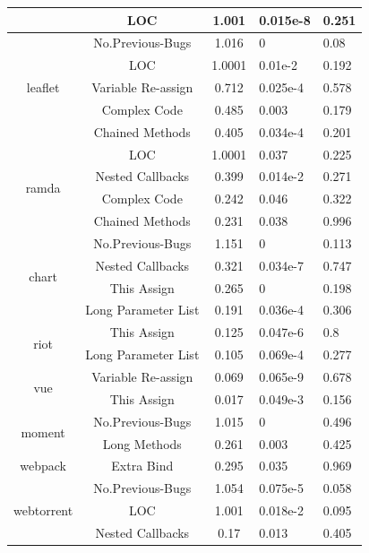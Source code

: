 \begin{table}[t]
\begin{tabular}{c|c|c|p{1.1cm}|p{1.3cm}}
		& LOC & 1.001 & 0.015e-8 & 0.251 \\ \hline
		\multirow{5}{*}{leaflet}
		& No.Previous-Bugs & 1.016 & 0 & 0.08 \\ \cline{2-5}
		& LOC & 1.0001 & 0.01e-2 & 0.192 \\ \cline{2-5}
		& Variable Re-assign & 0.712 & 0.025e-4 & 0.578 \\ \cline{2-5}
		& Complex Code & 0.485 & 0.003 & 0.179 \\ \cline{2-5}
		& Chained Methods & 0.405 & 0.034e-4 & 0.201 \\ \hline
		\multirow{4}{*}{ramda}
		& LOC & 1.0001 & 0.037 & 0.225 \\ \cline{2-5}
		& Nested Callbacks & 0.399 & 0.014e-2 & 0.271 \\ \cline{2-5}
		& Complex Code & 0.242 & 0.046 & 0.322 \\ \cline{2-5}
		& Chained Methods & 0.231 & 0.038 & 0.996 \\ \hline
		\multirow{4}{*}{chart}
		& No.Previous-Bugs & 1.151 & 0 & 0.113 \\ \cline{2-5}
		& Nested Callbacks & 0.321 & 0.034e-7 & 0.747 \\ \cline{2-5}
		& This Assign & 0.265 & 0 & 0.198 \\ \cline{2-5}
		& Long Parameter List & 0.191 & 0.036e-4 & 0.306 \\ \hline
		\multirow{2}{*}{riot}
		& This Assign & 0.125 & 0.047e-6 & 0.8 \\ \cline{2-5}
		& Long Parameter List & 0.105 & 0.069e-4 & 0.277 \\ \hline
		\multirow{2}{*}{vue}
		& Variable Re-assign & 0.069 & 0.065e-9 & 0.678 \\ \cline{2-5}
		& This Assign & 0.017 & 0.049e-3 & 0.156 \\ \hline
		\multirow{2}{*}{moment}
		& No.Previous-Bugs & 1.015 & 0 & 0.496 \\ \cline{2-5}
		& Long Methods & 0.261 & 0.003 & 0.425 \\ \hline
		\multirow{1}{*}{webpack}
		& Extra Bind & 0.295 & 0.035 & 0.969 \\ \hline
		\multirow{3}{*}{webtorrent}
		& No.Previous-Bugs & 1.054 & 0.075e-5 & 0.058 \\ \cline{2-5}
		& LOC & 1.001 & 0.018e-2 & 0.095 \\ \cline{2-5}
		& Nested Callbacks & 0.17 & 0.013 & 0.405 \\ \hline
	\end{tabular}
	\label{smelltypes2}
	\vspace{-15pt}
\end{table}

